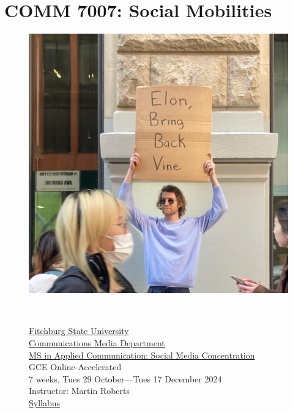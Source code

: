 \documentclass[
  letterpaper,
  DIV=11,
  numbers=noendperiod,
  oneside]{scrartcl}
\author{}
\date{}
\begin{document}
\pagestyle{mystyle}


\section{COMM 7007: Social
Mobilities}\label{comm-7007-social-mobilities}

\begin{figure}

\begin{minipage}{0.49\linewidth}
\href{https://www.instagram.com/dudewithsign/}{\includegraphics{img/dudewithsign.jpeg}}\end{minipage}%
%
\begin{minipage}{0.02\linewidth}
~\end{minipage}%
%
\begin{minipage}{0.49\linewidth}
\href{https://fitchburgstate.edu}{Fitchburg State University}\\
\href{https://www.fitchburgstate.edu/academics/academic-schools/school-arts-and-sciences/communications-media-department}{Communications
Media Department}\\
\href{https://www.fitchburgstate.edu/academics/programs/social-media-concentration-applied-communication-ms-online}{MS
in Applied Communication: Social Media Concentration}\\
GCE Online-Accelerated\\
7 weeks, Tues 29 October---Tues 17 December 2024\\
Instructor: Martin Roberts\\
\href{https://mroberts1.github.io/fsu-smt-su24}{Syllabus}\\
\href{mailto:mrober40@fitchburgstate.edu}{} \textbar{}
\href{https://github.com/mroberts1/fsu-social-mobilities-fa24}{}
\textbar{} \href{https://discord.gg/GUSz99EP}{}
\textbar{}
\href{https://www.youtube.com/playlist?list=PLx7AcHafElRiGpYPLRM29YzNMMEXyDqmh}{}\end{minipage}%


\end{figure}
\end{document}
